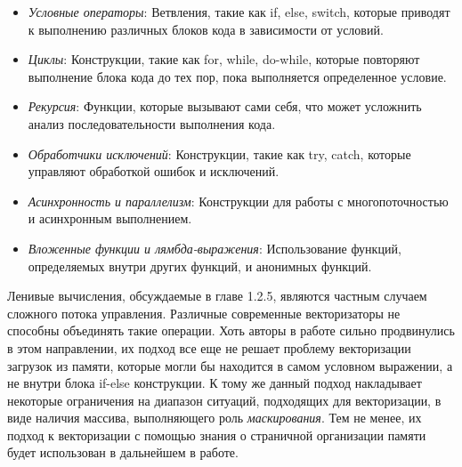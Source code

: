 \begin{itemize}
    \item \textit{Условные операторы}: Ветвления, такие как if, else, switch, которые приводят к выполнению различных блоков кода в зависимости от условий.
    \item \textit{Циклы}: Конструкции, такие как for, while, do-while, которые повторяют выполнение блока кода до тех пор, пока выполняется определенное условие.
    \item \textit{Рекурсия}: Функции, которые вызывают сами себя, что может усложнить анализ последовательности выполнения кода.
    \item \textit{Обработчики исключений}: Конструкции, такие как try, catch, которые управляют обработкой ошибок и исключений.
    \item \textit{Асинхронность и параллелизм}: Конструкции для работы с многопоточностью и асинхронным выполнением.
    \item \textit{Вложенные функции и лямбда-выражения}: Использование функций, определяемых внутри других функций, и анонимных функций.
\end{itemize}

Ленивые вычисления, обсуждаемые в главе 1.2.5, являются частным случаем сложного потока управления. Различные современные векторизаторы не способны объединять такие операции. Хоть авторы в работе \cite{pohl2018control} сильно продвинулись в этом направлении, их подход все еще не решает проблему векторизации загрузок из памяти, которые могли бы находится в самом условном выражении, а не внутри блока if-else конструкции. К тому же данный подход накладывает некоторые ограничения на диапазон ситуаций, подходящих для векторизации, в виде наличия массива, выполняющего роль \textit{маскирования}. Тем не менее, их подход к векторизации с помощью знания о страничной организации памяти будет использован в дальнейшем в работе.
\newpage
